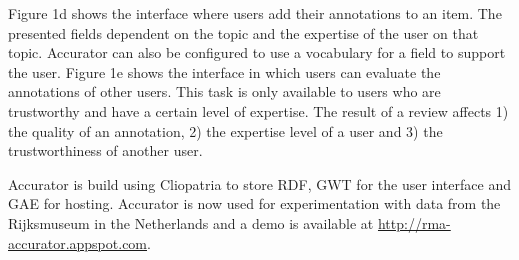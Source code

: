 Figure 1d shows the interface where users add their annotations to an item. The presented fields dependent on the topic and the expertise of the user on that topic. 
Accurator can also be configured to use a vocabulary for a field to support the user. Figure 1e shows the interface in which users can evaluate the annotations of other users. This task is only available to users who are trustworthy and have a certain level of expertise. The result of a review affects 1) the quality of an annotation, 2) the expertise level of a user and 3) the trustworthiness of another user.


Accurator is build using Cliopatria to store RDF, GWT for the user interface and GAE for hosting. Accurator is now used for experimentation with data from the Rijksmuseum in the Netherlands and a demo is available at \url{http://rma-accurator.appspot.com}.




